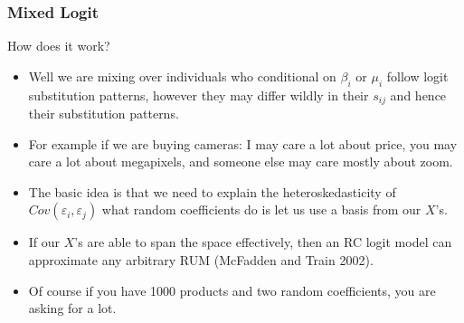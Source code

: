 \documentclass[xcolor=pdftex,dvipsnames,table,mathserif]{beamer}
\begin{document}
\begin{frame}
\frametitle{Mixed Logit}
How does it work?
 \begin{itemize}
\item Well we are mixing over individuals who conditional on $\beta_i$ or $\mu_i$ follow logit substitution patterns, however they may differ wildly in their $s_{ij}$ and hence their substitution patterns.
\item For example if we are buying cameras: I may care a lot about price, you may care a lot about megapixels, and someone else may care mostly about zoom.
\item The basic idea is that we need to explain the heteroskedasticity of $Cov(\varepsilon_i, \varepsilon_j)$ what random coefficients do is let us use a basis from our $X$'s.
\item If our $X$'s are able to span the space effectively, then an RC logit model can approximate any arbitrary RUM (McFadden and Train 2002). 
\item Of course if you have 1000 products and two random coefficients, you are asking for a lot.
 \end{itemize}
\end{frame}


%
\end{document}
